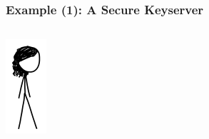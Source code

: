 \documentclass[12pt,english,dvipsnames]{beamer}
\newcommand{\green}[1]{{\color{cpacheckergreen}#1}}
\begin{document}
\begin{frame}[fragile]
    \frametitle{Example (1): A \green{Secure} Keyserver}

    \begin{columns}[b]
        \begin{column}{1.5cm}
        \includegraphics[width=\textwidth]{images/meg.png}
        \end{column}


\end{columns}
\end{frame}
\end{document}
